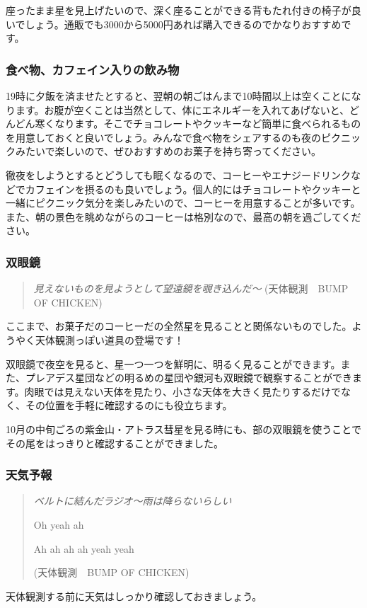\documentclass[../main]{subfiles}
\begin{document}
座ったまま星を見上げたいので、深く座ることができる背もたれ付きの椅子が良いでしょう。通販でも3000から5000円あれば購入できるのでかなりおすすめです。

\subsubsection{食べ物、カフェイン入りの飲み物}
19時に夕飯を済ませたとすると、翌朝の朝ごはんまで10時間以上は空くことになります。お腹が空くことは当然として、体にエネルギーを入れてあげないと、どんどん寒くなります。そこでチョコレートやクッキーなど簡単に食べられるものを用意しておくと良いでしょう。みんなで食べ物をシェアするのも夜のピクニックみたいで楽しいので、ぜひおすすめのお菓子を持ち寄ってください。

徹夜をしようとするとどうしても眠くなるので、コーヒーやエナジードリンクなどでカフェインを摂るのも良いでしょう。個人的にはチョコレートやクッキーと一緒にピクニック気分を楽しみたいので、コーヒーを用意することが多いです。また、朝の景色を眺めながらのコーヒーは格別なので、最高の朝を過ごしてください。

\subsubsection{双眼鏡}
\begin{verse}
  {\slshape
  見えないものを見ようとして望遠鏡を覗き込んだ〜
  }
  (天体観測　BUMP OF CHICKEN)
\end{verse}


ここまで、お菓子だのコーヒーだの全然星を見ることと関係ないものでした。ようやく天体観測っぽい道具の登場です！

双眼鏡で夜空を見ると、星一つ一つを鮮明に、明るく見ることができます。また、プレアデス星団などの明るめの星団や銀河も双眼鏡で観察することができます。肉眼では見えない天体を見たり、小さな天体を大きく見たりするだけでなく、その位置を手軽に確認するのにも役立ちます。

10月の中旬ごろの紫金山・アトラス彗星を見る時にも、部の双眼鏡を使うことでその尾をはっきりと確認することができました。

\subsubsection{天気予報}
\begin{verse}
  {\slshape
    ベルトに結んだラジオ〜雨は降らないらしい

    Oh yeah ah

    Ah ah ah ah yeah yeah

  }
  (天体観測　BUMP OF CHICKEN)
\end{verse}
天体観測する前に天気はしっかり確認しておきましょう。
\end{document}
